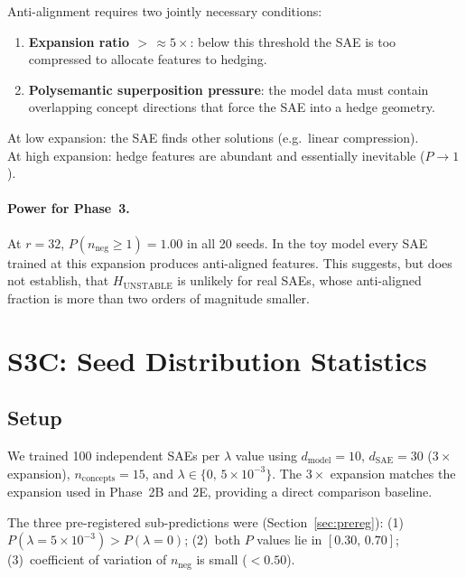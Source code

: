 \documentclass[11pt,a4paper]{article}
\newcommand{\nneg}{n_{\mathrm{neg}}}
\begin{document}
\begin{keyinsight}
Anti-alignment requires two jointly necessary conditions:
\begin{enumerate}[noitemsep, label=\arabic*.]
  \item \textbf{Expansion ratio ${>}\,{\approx}5\times$}:
    below this threshold the SAE is too compressed to allocate features to hedging.
  \item \textbf{Polysemantic superposition pressure}:
    the model data must contain overlapping concept directions
    that force the SAE into a hedge geometry.
\end{enumerate}
At low expansion: the SAE finds other solutions (e.g.\ linear compression).\\
At high expansion: hedge features are abundant and essentially inevitable ($P \to 1$).
\end{keyinsight}

\paragraph{Power for Phase~3.}
At $r{=}32$, $P(\nneg{\ge}1){=}1.00$ in all 20 seeds.  In the toy model every SAE
trained at this expansion produces anti-aligned features.  This suggests, but does not
establish, that $H_{\mathrm{UNSTABLE}}$ is unlikely for real SAEs, whose anti-aligned
fraction is more than two orders of magnitude smaller.

\section{S3C: Seed Distribution Statistics}
\label{sec:s3c}

\subsection{Setup}

We trained 100 independent SAEs per $\lambda$ value using
$d_{\mathrm{model}}{=}10$, $d_{\mathrm{SAE}}{=}30$ ($3\times$ expansion),
$n_{\mathrm{concepts}}{=}15$, and $\lambda \in \{0,\, 5\times10^{-3}\}$.
The $3\times$ expansion matches the expansion used in Phase~2B and 2E, providing
a direct comparison baseline.

The three pre-registered sub-predictions were (Section~\ref{sec:prereg}):
(1)~$P(\lambda{=}5\times10^{-3}) > P(\lambda{=}0)$;
(2)~both $P$ values lie in $[0.30,\,0.70]$;
(3)~coefficient of variation of $\nneg$ is small ($<0.50$).
\end{document}

